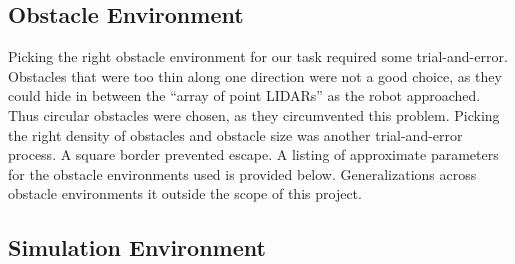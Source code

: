 \documentclass{article}
\begin{document}
\subsection{Obstacle Environment}
Picking the right obstacle environment for our task required some trial-and-error.  Obstacles that were too thin along one direction were not a good choice, as they could hide in between the ``array of point LIDARs'' as the robot approached.  Thus circular obstacles were chosen, as they circumvented this problem.  Picking the right density of obstacles and obstacle size was another trial-and-error process.  A square border prevented escape.  A listing of approximate parameters for the obstacle environments used is provided below.  Generalizations across obstacle environments it outside the scope of this project.


\subsection{Simulation Environment}
\end{document}
